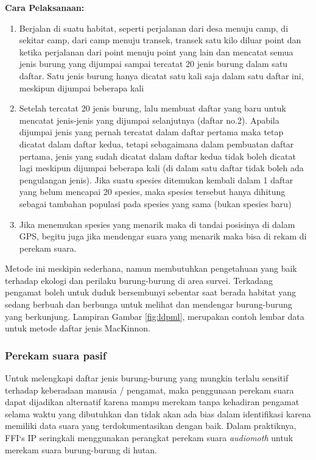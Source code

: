 \documentclass[
]{book}
\begin{document}
\textbf{Cara Pelaksanaan:}

\begin{enumerate}
\def\labelenumi{\arabic{enumi}.}
\item
  Berjalan di suatu habitat, seperti perjalanan dari desa menuju camp, di sekitar camp, dari camp menuju transek, transek satu kilo diluar point dan ketika perjalanan dari point menuju point yang lain dan mencatat semua jenis burung yang dijumpai sampai tercatat 20 jenis burung dalam satu daftar. Satu jenis burung hanya dicatat satu kali saja dalam satu daftar ini, meskipun dijumpai beberapa kali
\item
  Setelah tercatat 20 jenis burung, lalu membuat daftar yang baru untuk mencatat jenis-jenis yang dijumpai selanjutnya (daftar no.2). Apabila dijumpai jenis yang pernah tercatat dalam daftar pertama maka tetap dicatat dalam daftar kedua, tetapi sebagaimana dalam pembuatan daftar pertama, jenis yang sudah dicatat dalam daftar kedua tidak boleh dicatat lagi meskipun dijumpai beberapa kali (di dalam satu daftar tidak boleh ada pengulangan jenis). Jika suatu spesies ditemukan kembali dalam 1 daftar yang belum mencapai 20 spesies, maka spesies tersebut hanya dihitung sebagai tambahan populasi pada spesies yang sama (bukan spesies baru)
\item
  Jika menemukan spesies yang menarik maka di tandai posisinya di dalam GPS, begitu juga jika mendengar suara yang menarik maka bisa di rekam di perekam suara.
\end{enumerate}

Metode ini meskipin sederhana, namun membutuhkan pengetahuan yang baik terhadap ekologi dan perilaku burung-burung di area survei. Terkadang pengamat boleh untuk duduk bersembunyi sebentar saat berada habitat yang sedang berbuah dan berbunga untuk melihat dan mendengar burung-burung yang berkunjung. Lampiran Gambar \ref{fig:ldpml}, merupakan contoh lembar data untuk metode daftar jenis MacKinnon.

\hypertarget{perekam-suara-pasif}{%
\subsubsection*{Perekam suara pasif}\label{perekam-suara-pasif}}

Untuk melengkapi daftar jenis burung-burung yang mungkin terlalu sensitif terhadap keberadaan manusia / pengamat, maka penggunaan perekam suara dapat dijadikan alternatif karena mampu merekam tanpa kehadiran pengamat selama waktu yang dibutuhkan dan tidak akan ada bias dalam identifikasi karena memiliki data suara yang terdokumentasikan dengan baik. Dalam praktiknya, FFI`s IP seringkali menggunakan perangkat perekam suara \emph{audiomoth} untuk merekam suara burung-burung di hutan.
\end{document}
